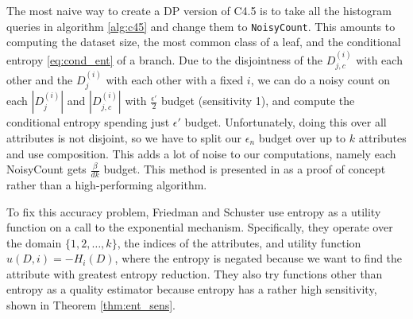 \documentclass[11pt]{article}
\begin{document}
The most naive way to create a DP version of C4.5 is to take all the histogram queries in algorithm \ref{alg:c45} and change them to \texttt{NoisyCount}. This amounts to computing the dataset size, the most common class of a leaf, and the conditional entropy \ref{eq:cond_ent} of a branch. Due to the disjointness of the $D^{(i)}_{j,c}$ with each other and the $D^{(i)}_j$ with each other with a fixed $i$, we can do a noisy count on each $|D^{(i)}_j|$ and $|D^{(i)}_{j,c}|$ with $\frac{\epsilon'}{2}$ budget (sensitivity 1), and compute the conditional entropy spending just $\epsilon'$ budget. Unfortunately, doing this over all attributes is not disjoint, so we have to split our $\epsilon_n$ budget over up to $k$ attributes and use composition. This adds a lot of noise to our computations, namely each NoisyCount gets $\frac{\beta}{dk}$ budget. This method is presented in \cite{Blum:2005} as a proof of concept rather than a high-performing algorithm.

To fix this accuracy problem, Friedman and Schuster \cite{Friedman:2010} use entropy as a utility function on a call to the exponential mechanism. Specifically, they operate over the domain $\{1,2,\ldots, k\}$, the indices of the attributes, and utility function $u(D, i) = -H_i(D)$, where the entropy is negated because we want to find the attribute with greatest entropy reduction. They also try functions other than entropy as a quality estimator because entropy has a rather high sensitivity, shown in Theorem \ref{thm:ent_sens}.
\end{document}
